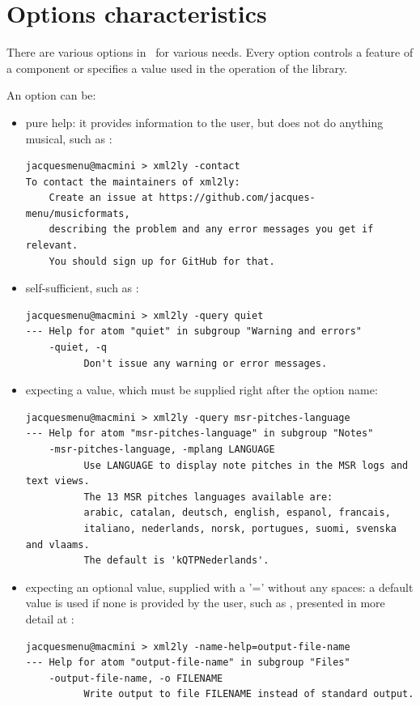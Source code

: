 \section{Options characteristics}\label{Options characteristics}

There are various options in \mf\ for various needs. Every option controls a feature of a component or specifies a value used in the operation of the library.

An option can be:
\begin{itemize}
\item pure help:
it provides information to the user, but does not do anything musical, such as :
\begin{lstlisting}[language=Terminal]
jacquesmenu@macmini > xml2ly -contact
To contact the maintainers of xml2ly:
    Create an issue at https://github.com/jacques-menu/musicformats,
    describing the problem and any error messages you get if relevant.
    You should sign up for GitHub for that.
\end{lstlisting}

\item self-sufficient, such as :
\begin{lstlisting}[language=Terminal]
jacquesmenu@macmini > xml2ly -query quiet
--- Help for atom "quiet" in subgroup "Warning and errors"
    -quiet, -q
          Don't issue any warning or error messages.
\end{lstlisting}

\item expecting a value, which must be supplied right after the option name:
\begin{lstlisting}[language=Terminal]
jacquesmenu@macmini > xml2ly -query msr-pitches-language
--- Help for atom "msr-pitches-language" in subgroup "Notes"
    -msr-pitches-language, -mplang LANGUAGE
          Use LANGUAGE to display note pitches in the MSR logs and text views.
          The 13 MSR pitches languages available are:
          arabic, catalan, deutsch, english, espanol, francais,
          italiano, nederlands, norsk, portugues, suomi, svenska and vlaams.
          The default is 'kQTPNederlands'.
\end{lstlisting}

\item expecting an optional value, supplied with a '=' without any spaces:
a default value is used if none is provided by the user, such as , presented in more detail at :
\begin{lstlisting}[language=Terminal]
jacquesmenu@macmini > xml2ly -name-help=output-file-name
--- Help for atom "output-file-name" in subgroup "Files"
    -output-file-name, -o FILENAME
          Write output to file FILENAME instead of standard output.
\end{lstlisting}

\end{itemize}

